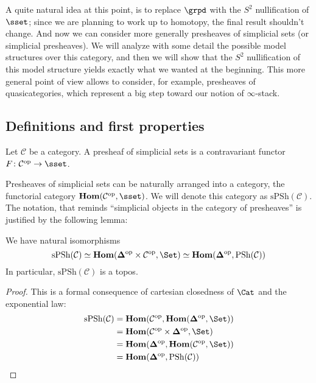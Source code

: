 A quite natural idea at this point, is to replace $\grpd$ with the $S^2$ nullification of $\sset$; since we are planning to work up to homotopy, the final result shouldn't change. And now we can consider more generally presheaves of simplicial sets (or simplicial presheaves). We will analyze with some detail the possible model structures over this category, and then we will show that the $S^2$ nullification of this model structure yields exactly what we wanted at the beginning. This more general point of view allows to consider, for example, presheaves of quasicategories, which represent a big step toward our notion of $\infty$-stack.

\subsection{Definitions and first properties}

\begin{defin}
Let $\mathcal C$ be a category. A presheaf of simplicial sets is a contravariant functor $F \colon \mathcal C^{\mathrm{op}} \to \sset$.
\end{defin}

Presheaves of simplicial sets can be naturally arranged into a category, the functorial category $\mathbf{Hom}(\mathcal C^{\mathrm{op}}, \sset)$. We will denote this category as $\mathrm{sPSh}(\mathcal C)$. The notation, that reminds ``simplicial objects in the category of presheaves'' is justified by the following lemma:

\begin{lemma} \label{lemma simplicial presheaves}
We have natural isomorphisms
\[
\mathrm{sPSh}(\mathcal C) \simeq \mathbf{Hom}(\mathbf \Delta^{\mathrm{op}} \times \mathcal C^{\mathrm{op}}, \Set) \simeq \mathbf{Hom}(\mathbf \Delta^{\mathrm{op}}, \mathrm{PSh}(\mathcal C))
\]
In particular, $\mathrm{sPSh}(\mathcal C)$ is a topos.
\end{lemma}

\begin{proof}
This is a formal consequence of cartesian closedness of $\Cat$ and the exponential law:
\begin{align*}
\mathrm{sPSh}(\mathcal C) & = \mathbf{Hom}(\mathcal C^{\mathrm{op}}, \mathbf{Hom}(\mathbf \Delta^{\mathrm{op}}, \Set)) \\
& = \mathbf{Hom}(\mathcal C^{\mathrm{op}} \times \mathbf \Delta^{\mathrm{op}}, \Set) \\
& = \mathbf{Hom}(\mathbf \Delta^{\mathrm{op}}, \mathbf{Hom}(\mathcal C^{\mathrm{op}}, \Set)) \\
& = \mathbf{Hom}(\mathbf \Delta^{\mathrm{op}}, \mathrm{PSh}(\mathcal C))
\end{align*}
\end{proof}

